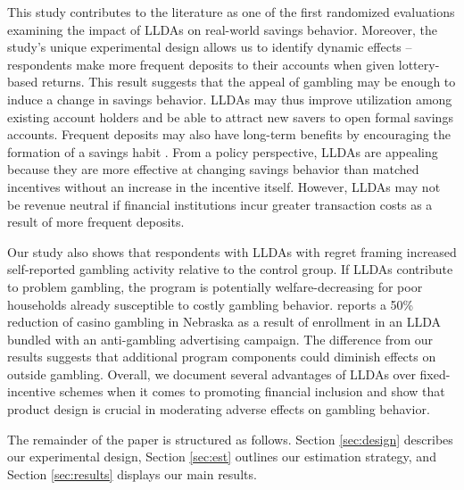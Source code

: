 \documentclass[10pt]{article}
\begin{document}
	This study contributes to the literature as one of the first randomized evaluations examining the impact of LLDAs on real-world savings behavior. Moreover, the study's unique experimental design allows us to identify dynamic effects -- respondents make more frequent deposits to their accounts when given lottery-based returns. This result suggests that the appeal of gambling may be enough to induce a change in savings behavior. LLDAs may thus improve utilization among existing account holders and be able to attract new savers to open formal savings accounts. Frequent deposits may also have long-term benefits by encouraging the formation of a savings habit . From a policy perspective, LLDAs are appealing because they are more effective at changing savings behavior than matched incentives without an increase in the incentive itself. However, LLDAs may not be revenue neutral if financial institutions incur greater transaction costs as a result of more frequent deposits.

	Our study also shows that respondents with LLDAs with regret framing increased self-reported gambling activity relative to the control group. If LLDAs contribute to problem gambling, the program is potentially welfare-decreasing for poor households already susceptible to costly gambling behavior.  reports a 50\% reduction of casino gambling in Nebraska as a result of enrollment in an LLDA bundled with an anti-gambling advertising campaign. The difference from our results suggests that additional program components could diminish effects on outside gambling. Overall, we document several advantages of LLDAs over fixed-incentive schemes when it comes to promoting financial inclusion and show that product design is crucial in moderating adverse effects on gambling behavior.

	The remainder of the paper is structured as follows. Section \ref{sec:design} describes our experimental design, Section \ref{sec:est} outlines our estimation strategy, and Section \ref{sec:results} displays our main results.


\end{document}
